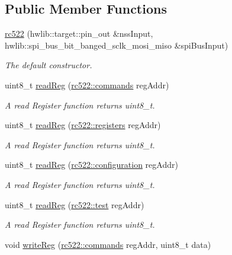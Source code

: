 \subsection*{Public Member Functions}
\begin{DoxyCompactItemize}
\item 
\hyperlink{classrc522_a7f123bdc20d19e897c883ec12f1f0849}{rc522} (hwlib\+::target\+::pin\+\_\+out \&nss\+Input, hwlib\+::spi\+\_\+bus\+\_\+bit\+\_\+banged\+\_\+sclk\+\_\+mosi\+\_\+miso \&spi\+Bus\+Input)
\begin{DoxyCompactList}\small\item\em The default constructor. \end{DoxyCompactList}\item 
uint8\+\_\+t \hyperlink{classrc522_a98c225391f24da6a963e67b5e89f96be}{read\+Reg} (\hyperlink{classrc522_a6df2359c88d6c2f47faf58bc9e09eaa4}{rc522\+::commands} reg\+Addr)
\begin{DoxyCompactList}\small\item\em A read Register function returns uint8\+\_\+t. \end{DoxyCompactList}\item 
uint8\+\_\+t \hyperlink{classrc522_a9398f2a0effc1a0acd48735d7d014c6e}{read\+Reg} (\hyperlink{classrc522_a83057db5f8fefa3dc9a6e8e5f0e191ee}{rc522\+::registers} reg\+Addr)
\begin{DoxyCompactList}\small\item\em A read Register function returns uint8\+\_\+t. \end{DoxyCompactList}\item 
uint8\+\_\+t \hyperlink{classrc522_a96857ef5f6e2a9b4bc7e6901f65907b5}{read\+Reg} (\hyperlink{classrc522_afcf27c8198d017cd4e8173c7d7a6fded}{rc522\+::configuration} reg\+Addr)
\begin{DoxyCompactList}\small\item\em A read Register function returns uint8\+\_\+t. \end{DoxyCompactList}\item 
uint8\+\_\+t \hyperlink{classrc522_a1b5a8b96bae53a3832e10054211f5064}{read\+Reg} (\hyperlink{classrc522_a9589917c9bbcd18ea9c7d86c7ec565bd}{rc522\+::test} reg\+Addr)
\begin{DoxyCompactList}\small\item\em A read Register function returns uint8\+\_\+t. \end{DoxyCompactList}\item 
void \hyperlink{classrc522_a3045ab844b8de82e9a5f3504c82c8995}{write\+Reg} (\hyperlink{classrc522_a6df2359c88d6c2f47faf58bc9e09eaa4}{rc522\+::commands} reg\+Addr, uint8\+\_\+t data)

\end{DoxyCompactItemize}

